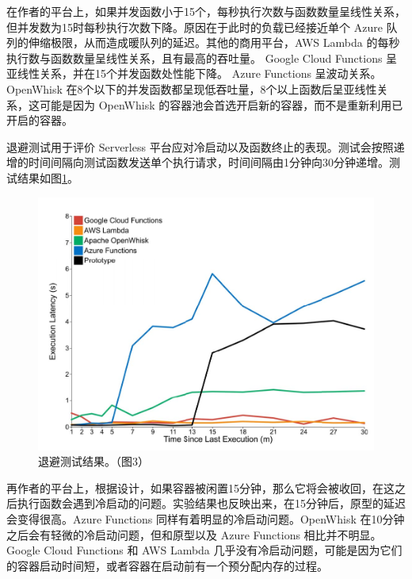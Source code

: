 \documentclass[11pt]{article}
\begin{document}
在作者的平台上，如果并发函数小于15个，每秒执行次数与函数数量呈线性关系，但并发数为15时每秒执行次数下降。原因在于此时的负载已经接近单个 Azure 队列的伸缩极限，从而造成暖队列的延迟。其他的商用平台，AWS Lambda 的每秒执行数与函数数量呈线性关系，且有最高的吞吐量。 Google Cloud Functions 呈亚线性关系，并在15个并发函数处性能下降。 Azure Functions 呈波动关系。 OpenWhisk 在8个以下的并发函数都呈现低吞吐量，8个以上函数后呈亚线性关系，这可能是因为 OpenWhisk 的容器池会首选开启新的容器，而不是重新利用已开启的容器。


退避测试用于评价 Serverless 平台应对冷启动以及函数终止的表现。测试会按照递增的时间间隔向测试函数发送单个执行请求，时间间隔由1分钟向30分钟递增。测试结果如图\ref{figs:2017_backoff_test}。
\begin{figure}[!htbp]
	\centering
	\includegraphics[width=0.8\linewidth]{figs/2017_backoff_test}
	\caption{退避测试结果。（\cite{mcgrath2017serverless}图3）}
	\label{figs:2017_backoff_test}
\end{figure}


再作者的平台上，根据设计，如果容器被闲置15分钟，那么它将会被收回，在这之后执行函数会遇到冷启动的问题。实验结果也反映出来，在15分钟后，原型的延迟会变得很高。Azure Functions 同样有着明显的冷启动问题。OpenWhisk 在10分钟之后会有轻微的冷启动问题，但和原型以及 Azure Functions 相比并不明显。Google Cloud Functions 和 AWS Lambda 几乎没有冷启动问题，可能是因为它们的容器启动时间短，或者容器在启动前有一个预分配内存的过程。
\end{document}
